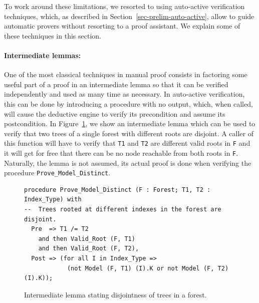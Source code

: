 \documentclass{llncs}
\begin{document}
To work around these limitations, we resorted to using auto-active verification techniques, which,
as described in Section~\ref{sec-prelim-auto-active}, allow to guide automatic provers without
resorting to a proof assistant. We explain some of these techniques in this section.

\paragraph{Intermediate lemmas:}
One of the most classical techniques in manual proof consists in factoring some useful
part of a proof in an intermediate lemma so that it can be verified independently and
used as many time as necessary. In auto-active verification, this can be done by introducing
a procedure with no output, which, when called, will cause the deductive engine to verify
its precondition and assume its postcondition. In Figure~\ref{fig-proof-lem}, we show an
intermediate lemma which can be used to verify that two trees of a single forest with different
roots are disjoint. A caller of this function will have to verify that \texttt{T1} and \texttt{T2} are different
valid roots in \texttt{F} and it will get for free that there can be no node reachable from both roots in \texttt{F}.
Naturally, the lemma is not assumed, its actual proof is done when verifying the procedure
\texttt{Prove\_Model\_Distinct}.

\begin{figure}
\begin{small}
\begin{lstlisting}
procedure Prove_Model_Distinct (F : Forest; T1, T2 : Index_Type) with
--  Trees rooted at different indexes in the forest are disjoint.
  Pre  => T1 /= T2
    and then Valid_Root (F, T1)
    and then Valid_Root (F, T2),
  Post => (for all I in Index_Type =>
            (not Model (F, T1) (I).K or not Model (F, T2) (I).K));
\end{lstlisting}
\end{small}
\caption{\label{fig-proof-lem} Intermediate lemma stating disjointness of trees in a forest.}
\end{figure}
\end{document}
